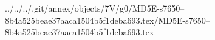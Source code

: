 ../../../.git/annex/objects/7V/g0/MD5E-s7650--8b4a525beae37aaca1504b5f1deba693.tex/MD5E-s7650--8b4a525beae37aaca1504b5f1deba693.tex